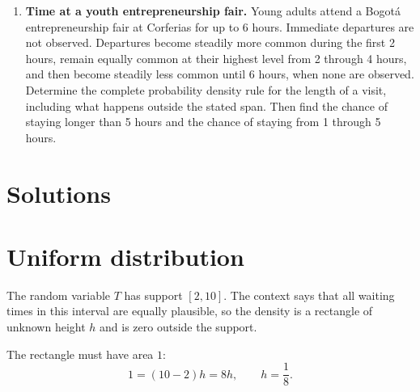 \begin{enumerate}[
		leftmargin=*,
		itemsep=2pt,
		parsep=0pt,
		topsep=2pt
		]
		\item \textbf{Time at a youth entrepreneurship fair.} Young adults attend
		a Bogot\'a entrepreneurship fair at Corferias for up to 6 hours.
		Immediate departures are not observed. Departures become
		steadily more common during the first 2 hours, remain equally common at
		their highest level from 2 through 4 hours, and then become steadily
		less common until 6 hours, when none are observed. Determine the
		complete probability density rule for the length of a visit, including
		what happens outside the stated span. Then find the chance of staying
		longer than 5 hours and the chance of staying from 1 through 5 hours.
		
	\end{enumerate}
	
	
	\newpage
	\restoregeometry
	
	\vspace*{-15mm}
	
	\section*{Solutions}
	
	
	\section{Uniform distribution}
	
	The random variable $T$ has support $[2,10]$.  The context says that all
	waiting times in this interval are equally plausible, so the density is a
	rectangle of unknown height $h$ and is zero outside the support.
	
	The rectangle must have area $1$:
	\[
	1=(10-2)h=8h,\qquad h=\frac18.
	\]
	
